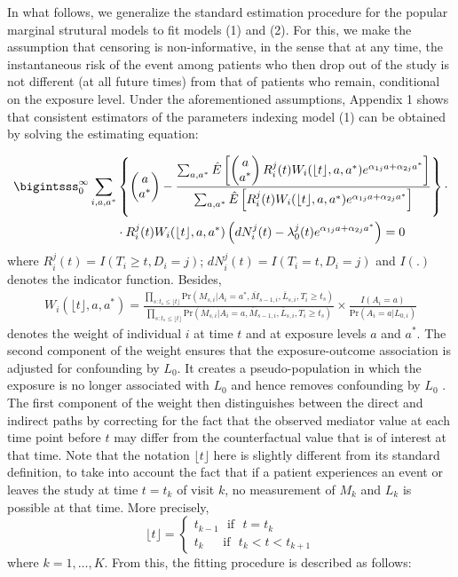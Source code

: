 \documentclass[AMA,STIX1COL]{WileyNJD-v2}
\newcommand{\pr}{\text{Pr}}
\begin{document}
In what follows, we generalize the standard estimation procedure for the popular marginal strutural models to fit models (1) and (2). For this, we make the assumption that censoring is non-informative, in the sense that at any time, the instantaneous risk of the event among patients who then drop out of the study is not different (at all future times) from that of patients who remain, conditional on the exposure level. Under the aforementioned assumptions, Appendix 1 shows that consistent estimators of the parameters indexing model (1) can be obtained by solving the estimating equation:

\begingroup
\fontsize{10pt}{10pt}\selectfont
 \begin{align*}
\bigintsss_0^{\infty} \sum_{i, a, a^*}&\left\{\begin{pmatrix} a \\ a^* \end{pmatrix} - \frac{\sum_{a,a^*}\hat E\left[\begin{pmatrix} a \\ a^* \end{pmatrix}
R_i^j(t)W_i(\lfloor t \rfloor ,a,a^*)e^{\alpha_{1j}a + \alpha_{2j}a^*}\right]}
{\sum_{a,a^*} \hat E\left[R_i^j(t)W_i(\lfloor t \rfloor ,a,a^*)e^{\alpha_{1j}a + \alpha_{2j}a^*}\right]}\right\}\cdot \\
& \cdot R_i^j(t)W_i(\lfloor t \rfloor ,a,a^*)\left(dN_i^j(t) - \lambda_0^j(t)e^{\alpha_{1j}a + \alpha_{2j}a^*}\right) = 0
\end{align*}
\endgroup%
where $R_i^j(t) = I(T_i\ge t, D_i = j)$;  $dN^j_i(t) = I(T_i = t, D_i = j)$ and $I(.)$ denotes the indicator function. Besides,
\begin{align*}
W_i(\lfloor t \rfloor ,a,a^*) = \frac{\prod_{s:t_s\le \lfloor t \rfloor } \pr(M_{s,i}|A_i = a^*, \overline{M}_{s - 1,i}, \overline{L}_{s,i}, T_i \ge t_s)}{\prod_{s:t_s\le \lfloor t \rfloor} \pr(M_{s,i}|A_i = a, \overline{M}_{s - 1,i}, \overline{L}_{s,i}, T_i \ge t_s)}\times \frac{I(A_i = a)}{\pr(A_i=a|L_{0,i})}
\end{align*}
denotes the weight of individual $i$ at time $t$ and at exposure levels $a$ and $a^*$. The second component of the weight ensures that the exposure-outcome association is adjusted for confounding by $L_0$. It creates a pseudo-population in which the exposure is no longer associated with $L_0$ and hence removes confounding by $L_0$ \citep{lange12}. The first component of the weight then distinguishes between the direct and indirect paths by correcting for the fact that the observed mediator value at each time point before $t$ may differ from the counterfactual value that is of interest at that time. Note that the notation $\lfloor t \rfloor$ here is slightly different from its standard definition, to take into account the fact that if a patient experiences an event or leaves the study at time $t=t_k$ of visit $k$, no measurement of $M_k$ and $L_k$ is possible at that time. More precisely,
\[\lfloor t \rfloor= \begin{cases}
t_{k-1}~~~\mathrm{if}~~~ t=t_k\\
t_k~~~~~~~\mathrm{if}~~~ t_k < t < t_{k+1}
\end{cases}\]
where $ k =1,\ldots,K$. From this, the fitting procedure is described as follows:
\end{document}
